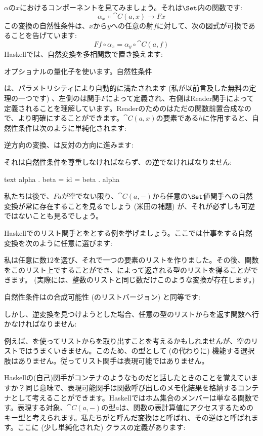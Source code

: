 $\alpha$の$x$におけるコンポーネントを見てみましょう。それは$\Set$内の関数です: 
\[\alpha_x \Colon \cat{C}(a, x) \to F x\]
この変換の自然性条件は、$x$から$y$への任意の射$f$に対して、次の図式が可換であることを告げています: 
\[F f \circ \alpha_x = \alpha_y \circ \cat{C}(a, f)\]
Haskellでは、自然変換を多相関数で置き換えます: 

オプショナルの量化子を使います。自然性条件

は、パラメトリシティにより自動的に満たされます (私が以前言及した無料の定理の一つです) 、左側のは関手$F$によって定義され、右側はReader関手によって定義されることを理解しています。Readerのためのはただの関数前置合成なので、より明確にすることができます。$\cat{C}(a, x)$の要素である$h$に作用すると、自然性条件は次のように単純化されます: 

逆方向の変換、は反対の方向に進みます: 

それは自然性条件を尊重しなければならず、の逆でなければなりません: 

\begin{snip}{text}
alpha . beta = id = beta . alpha
\end{snip}
私たちは後で、$F a$が空でない限り、$\cat{C}(a, -)$から任意の$\Set$値関手への自然変換が常に存在することを見るでしょう (米田の補題) が、それが必ずしも可逆ではないことも見るでしょう。

Haskellでのリスト関手とをとする例を挙げましょう。ここでは仕事をする自然変換を次のように任意に選びます: 

私は任意に数12を選び、それで一つの要素のリストを作りました。その後、関数をこのリスト上ですることができ、によって返される型のリストを得ることができます。 (実際には、整数のリストと同じ数だけこのような変換が存在します。) 

自然性条件はの合成可能性 (のリストバージョン) と同等です: 

しかし、逆変換を見つけようとした場合、任意の型のリストからを返す関数へ行かなければなりません: 

例えば、を使ってリストからを取り出すことを考えるかもしれませんが、空のリストではうまくいきません。このため、の型として (の代わりに) 機能する選択肢はありません。従ってリスト関手は表現可能ではありません。

Haskellの(自己)関手がコンテナのようなものだと話したときのことを覚えていますか？同じ意味で、表現可能関手は関数呼び出しのメモ化結果を格納するコンテナとして考えることができます。Haskellではホム集合のメンバーは単なる関数です。表現する対象、$\cat{C}(a, -)$の型$a$は、関数の表計算値にアクセスするためのキー型と考えられます。私たちがと呼んだ変換はと呼ばれ、その逆はと呼ばれます。ここに (少し単純化された) クラスの定義があります: 

